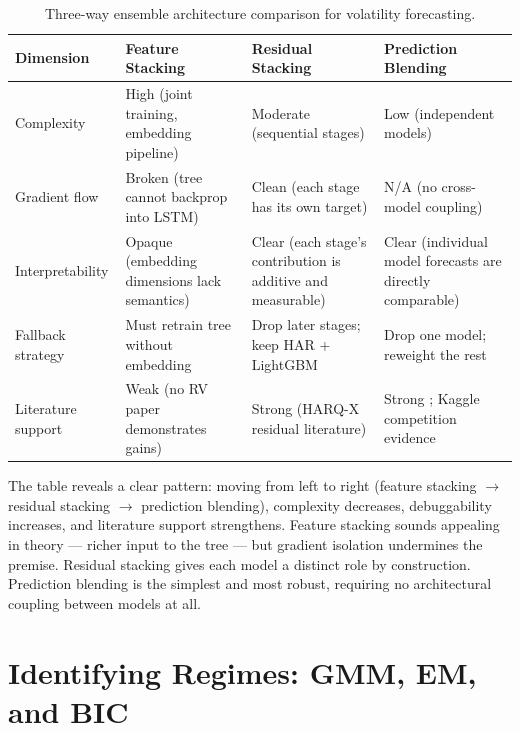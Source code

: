 \begin{table}[htbp]
\centering
\caption{Three-way ensemble architecture comparison for volatility
  forecasting.}
\label{tab:arch-comparison}
\small
\begin{tabular}{@{}p{2.4cm}p{3.0cm}p{3.0cm}p{3.5cm}@{}}
\toprule
\textbf{Dimension}
  & \textbf{Feature Stacking}
  & \textbf{Residual Stacking}
  & \textbf{Prediction Blending} \\
\midrule
Complexity
  & High (joint training, embedding pipeline)
  & Moderate (sequential stages)
  & Low (independent models) \\
\addlinespace
Gradient flow
  & Broken (tree cannot backprop into LSTM)
  & Clean (each stage has its own target)
  & N/A (no cross-model coupling) \\
\addlinespace
Interpretability
  & Opaque (embedding dimensions lack semantics)
  & Clear (each stage's contribution is additive and measurable)
  & Clear (individual model forecasts are directly comparable) \\
\addlinespace
Fallback strategy
  & Must retrain tree without embedding
  & Drop later stages; keep HAR + LightGBM
  & Drop one model; reweight the rest \\
\addlinespace
Literature support
  & Weak (no RV paper demonstrates gains)
  & Strong (HARQ-X residual literature)
  & Strong \citep{Optiver2021}; Kaggle competition evidence \\
\bottomrule
\end{tabular}
\end{table}

\begin{intuition}
The table reveals a clear pattern: moving from left to right (feature
stacking $\to$ residual stacking $\to$ prediction blending), complexity
decreases, debuggability increases, and literature support strengthens.
Feature stacking sounds appealing in theory --- richer input to the
tree --- but gradient isolation undermines the premise.  Residual
stacking gives each model a distinct role by construction.  Prediction
blending is the simplest and most robust, requiring no architectural
coupling between models at all.
\end{intuition}


\section{Identifying Regimes: GMM, EM, and BIC}
\label{sec:hybrid:regimes}

